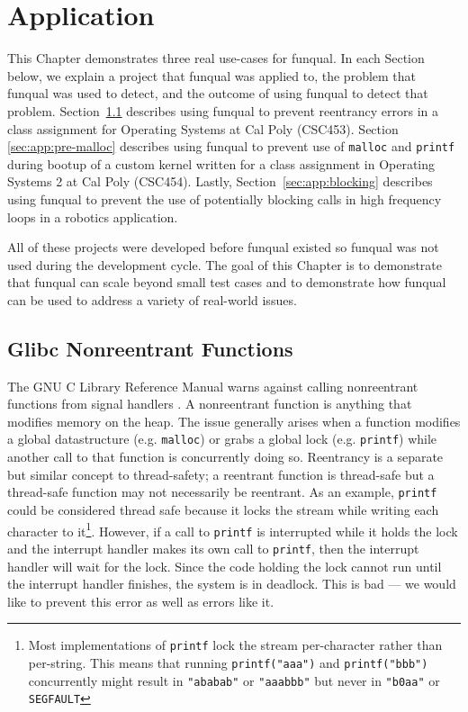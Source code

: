 \chapter{Application}\label{sec:application}

This Chapter demonstrates three real use-cases for funqual.  In each Section below, we explain a project that funqual was applied to, the problem that funqual was used to detect, and the outcome of using funqual to detect that problem.  \mbox{Section \ref{sec:app:reentrancy}} describes using funqual to prevent reentrancy errors in a class assignment for Operating Systems at Cal Poly (CSC453).  Section \ref{sec:app:pre-malloc} describes using funqual to prevent use of \lstinline{malloc} and \lstinline{printf} during bootup of a custom kernel written for a class assignment in Operating Systems 2 at Cal Poly (CSC454).  Lastly, \mbox{Section \ref{sec:app:blocking}} describes using funqual to prevent the use of potentially blocking calls in high frequency loops in a robotics application.  

All of these projects were developed before funqual existed so funqual was not used during the development cycle.  The goal of this Chapter is to demonstrate that funqual can scale beyond small test cases and to demonstrate how funqual can be used to address a variety of real-world issues.  

\section{Glibc Nonreentrant Functions}\label{sec:app:reentrancy}


The GNU C Library Reference Manual warns against calling nonreentrant functions from signal handlers \cite{gnu-manual}.  A nonreentrant function is anything that modifies memory on the heap.  The issue generally arises when a function modifies a global datastructure (e.g. \lstinline{malloc}) or grabs a global lock (e.g. \lstinline{printf}) while another call to that function is concurrently doing so.  Reentrancy is a separate but similar concept to thread-safety; a reentrant function is thread-safe but a thread-safe function may not necessarily be reentrant.  As an example, \lstinline{printf} could be considered thread safe because it locks the stream while writing each character to it\footnote{Most implementations of \lstinline{printf} lock the stream per-character rather than per-string.  This means that running \mbox{\lstinline{printf("aaa")}} and \mbox{\lstinline{printf("bbb")}} concurrently might result in \mbox{\lstinline{"ababab"}} or \mbox{\lstinline{"aaabbb"}} but never in \mbox{\lstinline{"b0aa"}} or \mbox{\lstinline{SEGFAULT}}}.  However, if a call to \lstinline{printf} is interrupted while it holds the lock and the interrupt handler makes its own call to \lstinline{printf}, then the interrupt handler will wait for the lock.  Since the code holding the lock cannot run until the interrupt handler finishes, the system is in deadlock.  This is bad --- we would like to prevent this error as well as errors like it.  


